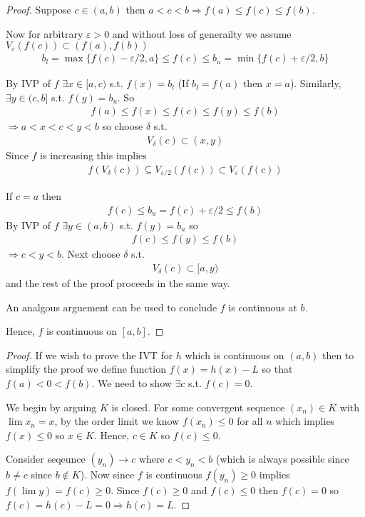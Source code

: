 \begin{proof}
    Suppose $c\in (a,b)$ then $a<c<b \Rightarrow f(a)\leq f(c)\leq f(b)$.

    Now for arbitrary $\varepsilon>0$ and without loss
    of generailty we assume $V_\varepsilon(f(c))\subset (f(a),f(b))$
    \begin{align*}
        b_l = \max\{f(c)-\varepsilon/2, a\} \leq f(c) \leq
         b_u=\min\{f(c)+\varepsilon/2,b\}
    \end{align*}

    By IVP of $f$ $\exists x\in [a,c)$ s.t. $f(x)=b_l$ 
    (If $b_l=f(a)$ then $x=a$).
    Similarly, $\exists y\in (c,b]$ s.t. $f(y)=b_u$. So
    \begin{align*}
        f(a) \leq f(x)\leq f(c)\leq f(y) \leq f(b)
    \end{align*}
    $\Rightarrow a<x<c<y<b$ so choose $\delta$ s.t. 
    \begin{align*}
        V_\delta(c) \subset (x,y)
    \end{align*}
    Since $f$ is increasing this implies 
    \begin{align*}
        f(V_\delta(c)) \subseteq V_{\varepsilon/2}(f(c)) \subset
         V_{\varepsilon}(f(c))
    \end{align*}

    If $c=a$ then 
    \begin{align*}
        f(c) \leq b_u=f(c)+\varepsilon/2 \leq f(b)
    \end{align*}
    By IVP of $f$ $\exists y\in (a,b)$ s.t. $f(y)=b_u$ so  
    \begin{align*}
        f(c)\leq f(y)\leq f(b)
    \end{align*}
    $\Rightarrow c<y<b$. Next choose $\delta$ s.t. 
    \begin{align*}
        V_\delta(c) \subset [a,y)
    \end{align*}
    and the rest of the proof proceeds in the same way.

    An analgous arguement can be used to conclude $f$ is
    continuous at $b$. 
    
    Hence, $f$ is continuous on $[a,b]$.
\end{proof}

\begin{proof}
    If we wish to prove the IVT for $h$ which is continuous on 
    $(a,b)$ then to simplify the proof we define 
    function $f(x)=h(x) - L$ so that $f(a)<0<f(b)$.
    We need to show $\exists c$ s.t. $f(c)=0$.

    We begin by arguing $K$ is closed.
    For some convergent sequence $(x_n)\in K$ with 
    $\lim x_n = x$,
    by the order limit \Thm we know $f(x_n)\leq 0$ for all 
    $n$ which implies $f(x)\leq 0$ so $x\in K$.
    Hence, $c\in K$ so $f(c)\leq 0$.
    
    Consider seqeunce $(y_n)\rightarrow c$ where $c<y_n<b$ 
    (which is always possible since 
    $b\neq c$ since $b\not\in K$). Now since $f$ is 
    continuous
    $f(y_n)\geq 0$ implies $f(\lim y)=f(c)\geq 0$.
    Since $f(c)\geq 0$ and $f(c)\leq 0$ then $f(c)=0$
    so $f(c)=h(c)-L=0 \Rightarrow h(c)=L$.
\end{proof}

